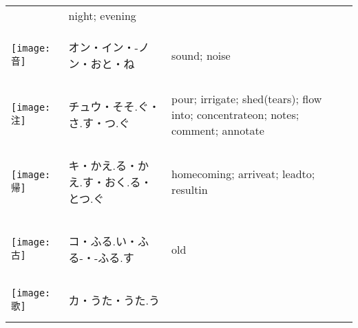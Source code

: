 \documentclass[a4paper,12pt]{extarticle}
\begin{document}
\begin{longtable}{|lp{6cm}p{4cm}|}
&
night; evening
\\ 
\begin{minipage}{0.3\textwidth}
\centerline{
	\texttt{[image: 音]}
}
\end{minipage}
&
\begin{CJK}{UTF8}{min}オン・イン・-ノン・おと・ね\end{CJK}
&
sound; noise
\\ 
\begin{minipage}{0.3\textwidth}
\centerline{
	\texttt{[image: 注]}
}
\end{minipage}
&
\begin{CJK}{UTF8}{min}チュウ・そそ.ぐ・さ.す・つ.ぐ\end{CJK}
&
pour; irrigate; shed(tears); flow into; concentrateon; notes; comment; annotate
\\ 
\begin{minipage}{0.3\textwidth}
\centerline{
	\texttt{[image: 帰]}
}
\end{minipage}
&
\begin{CJK}{UTF8}{min}キ・かえ.る・かえ.す・おく.る・とつ.ぐ\end{CJK}
&
homecoming; arriveat; leadto; resultin
\\ 
\begin{minipage}{0.3\textwidth}
\centerline{
	\texttt{[image: 古]}
}
\end{minipage}
&
\begin{CJK}{UTF8}{min}コ・ふる.い・ふる-・-ふる.す\end{CJK}
&
old
\\ 
\begin{minipage}{0.3\textwidth}
\centerline{
	\texttt{[image: 歌]}
}
\end{minipage}
&
\begin{CJK}{UTF8}{min}カ・うた・うた.う\end{CJK}

\end{longtable}
\end{document}
